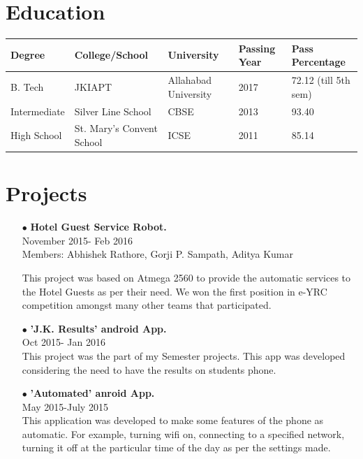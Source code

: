\documentclass[12pt]{article}
\begin{document}
\section*{Education}
\begin{tabular}{|l|l|l|l|l|}
\hline
Degree & College/School & University & Passing Year & Pass Percentage\\
\hline
B. Tech & JKIAPT & Allahabad University & 2017 & 72.12 (till 5th sem)\\
\hline
Intermediate & Silver Line School & CBSE & 2013 & 93.40\\
\hline
High School & St. Mary's Convent School & ICSE & 2011 & 85.14\\
\hline
\end{tabular}

\section*{Projects}
\begin{itemize}
\item[$\bullet$]\textbf{Hotel Guest Service Robot.}\\November 2015- Feb 2016\\Members: Abhishek Rathore, Gorji P. Sampath, Aditya Kumar

This project was based on Atmega 2560 to provide the automatic services to the Hotel Guests as per their need. We won the first position in e-YRC competition amongst many other teams that participated.
\item[$\bullet$]\textbf{'J.K. Results' android App.}\\Oct 2015- Jan 2016\\
This project was the part of my Semester projects. This app was developed considering the need to have the results on students phone.
\item[$\bullet$]\textbf{'Automated' anroid App.}\\May 2015-July 2015\\
This application was developed to make some features of the phone as automatic. For example, turning wifi on, connecting to a specified network, turning it off at the particular time of the day as per the settings made.
\end{itemize}
\end{document}
